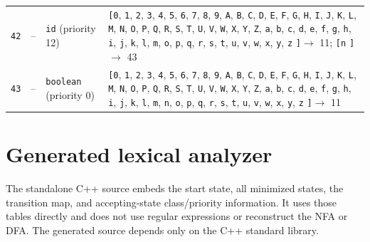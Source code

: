 \documentclass[11pt,a4paper]{article}
\newcommand{\opensymbolset}{\texttt{[}}
\newcommand{\closesymbolset}{\texttt{]}}
\begin{document}
\begin{landscape}
\begin{longtable}{
    >{\centering\arraybackslash}p{0.8cm}
    >{\centering\arraybackslash}p{0.7cm}
    >{\raggedright\arraybackslash}p{3.7cm}
    >{\raggedright\arraybackslash}p{18.1cm}
}
\texttt{42} & -- & \texttt{id} (priority 12) & \opensymbolset \texttt{0}, \texttt{1}, \texttt{2}, \texttt{3}, \texttt{4}, \texttt{5}, \texttt{6}, \texttt{7}, \texttt{8}, \texttt{9}, \texttt{A}, \texttt{B}, \texttt{C}, \texttt{D}, \texttt{E}, \texttt{F}, \texttt{G}, \texttt{H}, \texttt{I}, \texttt{J}, \texttt{K}, \texttt{L}, \texttt{M}, \texttt{N}, \texttt{O}, \texttt{P}, \texttt{Q}, \texttt{R}, \texttt{S}, \texttt{T}, \texttt{U}, \texttt{V}, \texttt{W}, \texttt{X}, \texttt{Y}, \texttt{Z}, \texttt{a}, \texttt{b}, \texttt{c}, \texttt{d}, \texttt{e}, \texttt{f}, \texttt{g}, \texttt{h}, \texttt{i}, \texttt{j}, \texttt{k}, \texttt{l}, \texttt{m}, \texttt{o}, \texttt{p}, \texttt{q}, \texttt{r}, \texttt{s}, \texttt{t}, \texttt{u}, \texttt{v}, \texttt{w}, \texttt{x}, \texttt{y}, \texttt{z} \closesymbolset $\to$ 11; \opensymbolset \texttt{n} \closesymbolset $\to$ 43 \\
\texttt{43} & -- & \texttt{boolean} (priority 0) & \opensymbolset \texttt{0}, \texttt{1}, \texttt{2}, \texttt{3}, \texttt{4}, \texttt{5}, \texttt{6}, \texttt{7}, \texttt{8}, \texttt{9}, \texttt{A}, \texttt{B}, \texttt{C}, \texttt{D}, \texttt{E}, \texttt{F}, \texttt{G}, \texttt{H}, \texttt{I}, \texttt{J}, \texttt{K}, \texttt{L}, \texttt{M}, \texttt{N}, \texttt{O}, \texttt{P}, \texttt{Q}, \texttt{R}, \texttt{S}, \texttt{T}, \texttt{U}, \texttt{V}, \texttt{W}, \texttt{X}, \texttt{Y}, \texttt{Z}, \texttt{a}, \texttt{b}, \texttt{c}, \texttt{d}, \texttt{e}, \texttt{f}, \texttt{g}, \texttt{h}, \texttt{i}, \texttt{j}, \texttt{k}, \texttt{l}, \texttt{m}, \texttt{n}, \texttt{o}, \texttt{p}, \texttt{q}, \texttt{r}, \texttt{s}, \texttt{t}, \texttt{u}, \texttt{v}, \texttt{w}, \texttt{x}, \texttt{y}, \texttt{z} \closesymbolset $\to$ 11 \\
\end{longtable}
\end{landscape}

\section{Generated lexical analyzer}

The standalone C++ source embeds the start state, all minimized states,
the transition map, and accepting-state class/priority information. It
uses those tables directly and does not use regular expressions or
reconstruct the NFA or DFA. The generated source depends only on the C++
standard library.
\end{document}
